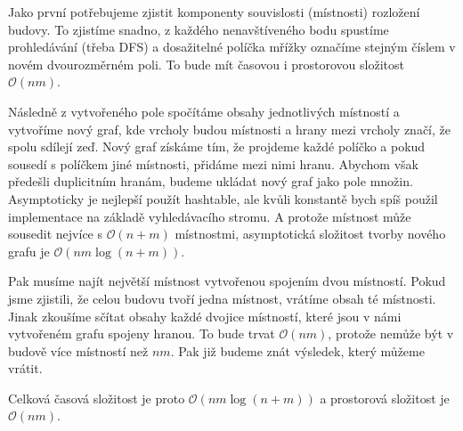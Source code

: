 \documentclass{fkssolpub}
\author{Ondřej Sedláček}
\begin{document}
Jako první potřebujeme zjistit komponenty souvislosti (místnosti) rozložení budovy.
To zjistíme snadno, z každého nenavštíveného bodu spustíme prohledávání (třeba
DFS) a dosažitelné políčka mřížky označíme stejným číslem v novém dvourozměrném
poli. To bude mít časovou i prostorovou složitost $\mathcal{O}(n m)$.

Následně z vytvořeného pole spočítáme obsahy jednotlivých místností a vytvoříme
nový graf, kde vrcholy budou místnosti a hrany mezi vrcholy značí, že spolu
sdílejí zeď. Nový graf získáme tím, že projdeme každé políčko a pokud
sousedí s políčkem jiné místnosti, přidáme mezi nimi hranu. Abychom však předešli duplicitním
hranám, budeme ukládat nový graf jako pole množin. Asymptoticky je nejlepší
použít hashtable, ale kvůli konstantě bych spíš použil implementace na základě
vyhledávacího stromu. A protože místnost může sousedit nejvíce s $\mathcal{O}(n + m)$
místnostmi, asymptotická složitost tvorby nového grafu je $\mathcal{O}(n m \log (n + m))$.

Pak musíme najít největší místnost vytvořenou spojením dvou místností. Pokud
jsme zjistili, že celou budovu tvoří jedna místnost, vrátíme obsah té místnosti.
Jinak zkoušíme sčítat obsahy každé dvojice místností, které jsou v námi vytvořeném grafu
spojeny hranou. To bude trvat $\mathcal{O}(n m)$, protože nemůže být v budově více
místností než $n m$. Pak již budeme znát výsledek, který můžeme vrátit.

Celková časová složitost je proto $\mathcal{O}(n m \log(n + m))$ a prostorová
složitost je $\mathcal{O}(n m)$.
\end{document}
